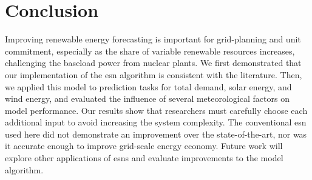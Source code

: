 \section{Conclusion}

Improving renewable energy forecasting is important for grid-planning
and unit commitment, especially as the share of variable renewable resources
increases, challenging the baseload power from nuclear plants. We first
demonstrated that our implementation of the \gls{esn} algorithm is consistent
with the literature. Then, we applied this model to prediction tasks for
total demand, solar energy, and wind energy, and evaluated the influence of
several meteorological factors on model performance. Our results show that
researchers must carefully choose each additional input to avoid increasing the
system complexity.
The conventional \gls{esn} used here did not demonstrate an
improvement over the state-of-the-art, nor was it accurate enough to improve
grid-scale energy economy. Future work will explore other applications of
\glspl{esn} and evaluate improvements to the model algorithm.
